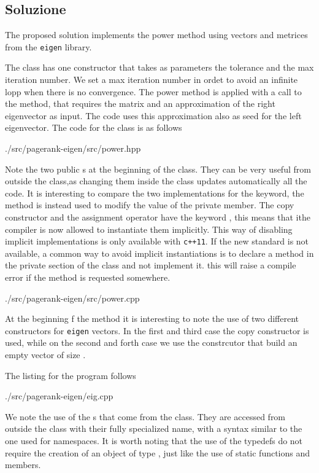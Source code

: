 \subsection*{Soluzione}

The proposed solution implements the power method using vectors and metrices
from the \texttt{eigen} library.

The class  has one constructor
that takes as parameters the tolerance and the max iteration number. We set
a max iteration number in ordet to avoid an infinite lopp when there is no
convergence. The power method is applied with a call to the  method,
that requires the matrix and an approximation of the right eigenvector as
input. The code uses this approximation also as seed for the left eigenvector.
The code for the  class is as follows
%
\lstset{basicstyle=\scriptsize\sf}
    
    {./src/pagerank-eigen/src/power.hpp}
\lstset{basicstyle=\sf}

Note the two public s at the beginning of the class. They can be
very useful from outside the class,as changing them inside the class updates
automatically all the code. It is interesting to compare the two implementations
for the \cpp{tol| and \cpp{maxit} methods. When there is a \cpp{const} keyword 
at the end of the definition, it means that the method is intended to be just
for access. When there is no \cpp[const} keyword, the method is instead used to
modify the value of the private member. The copy constructor and the assignment
operator have the keyword , this means that ithe compiler is now
allowed to instantiate them implicitly. This way of disabling implicit
implementations is only available with \texttt{c++11}. If the new standard is
not available, a common way to avoid implicit instantiations is to declare a
method in the private section of the class and not implement it. this will raise
a compile error if the method is requested somewhere.

\lstset{basicstyle=\scriptsize\sf}
    
    {./src/pagerank-eigen/src/power.cpp}
\lstset{basicstyle=\sf}

At the beginning f the  method it is interesting to note the use of
two different constructors for \texttt{eigen} vectors. In the first and third
case the copy constructor is used, while on the second and forth case we use the
constrcutor that build an empty vector of size .

The listing for the  program follows
\lstset{basicstyle=\scriptsize\sf}
    
    {./src/pagerank-eigen/eig.cpp}
\lstset{basicstyle=\sf}

We note the use of the s that come from the 
class. They are accessed from outside the class with their fully specialized
name, with a syntax similar to the one used for namespaces. It is worth noting
that the use of the typedefs do not require the creation of an object of type
, just like the use of static functions and members.

